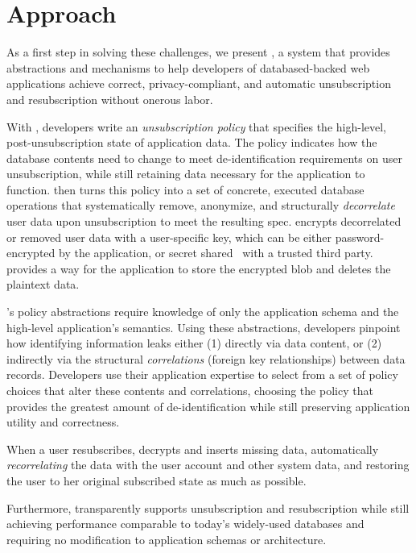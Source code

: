 \section{Approach}
As a first step in solving these challenges, we present \sys, a system that provides abstractions
and mechanisms to help developers of databased-backed web applications achieve correct,
privacy-compliant, and automatic unsubscription and resubscription without onerous labor.

With \sys, developers write an \emph{unsubscription policy} that specifies the high-level,
post-unsubscription state of application data.  The policy indicates how the database contents need
to change to meet de-identification requirements on user unsubscription, while still retaining data
necessary for the application to function. \sys then turns this policy into a set of concrete,
executed database operations that systematically remove, anonymize, and structurally
\emph{decorrelate} user data upon unsubscription to meet the resulting spec. \sys 
encrypts decorrelated or removed user data with a user-specific key, which can be either
password-encrypted by the application, or secret shared~\cite{secretsharing} with a trusted third
party. \sys provides a way for the application to store the encrypted blob and deletes the plaintext
data.

\sys's policy abstractions require knowledge of only the application schema and the high-level
application's semantics. Using these abstractions, developers pinpoint how identifying information
leaks either (1) directly via data content, or (2) indirectly via the structural \emph{correlations}
(foreign key relationships) between data records. Developers use their application expertise to
select from a set of policy choices that alter these contents and correlations, choosing the policy
that provides the greatest amount of de-identification while still preserving application
utility and correctness.

When a user resubscribes, \sys decrypts and inserts missing data, automatically
\emph{recorrelating} the data with the user account and other system data, and restoring the user to her
original subscribed state as much as possible.

Furthermore, \sys transparently supports unsubscription and resubscription while still achieving performance
comparable to today’s widely-used databases and requiring no modification to application schemas or
architecture.
